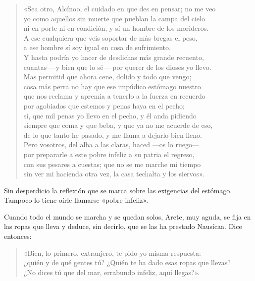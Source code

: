 \documentclass[11pt,a4paper]{article}
\begin{document}
\begin{verse}
«Sea otro, Alcínoo, el cuidado en que des en pensar; no me veo\\
yo como aquellos sin muerte que pueblan la campa del cielo\\
ni en porte ni en condición, y sí un hombre de los morideros.\\
A ese cualquiera que veis soportar de más bregas el peso,\\
a ese hombre sí soy igual en cosa de sufrimiento.\\
Y hasta podría yo hacer de desdichas más grande recuento,\\
cuantas ---y bien que lo sé--- por querer de los dioses yo llevo.\\
Mas permitid que ahora cene, dolido y todo que vengo;\\
cosa más perra no hay que ese impúdico estómago nuestro\\
que nos reclama y apremia a tenerlo a la fuerza en recuerdo\\
por agobiados que estemos y penas haya en el pecho;\\
sí, que mil penas yo llevo en el pecho, y él anda pidiendo\\
siempre que coma y que beba, y que ya no me acuerde de eso,\\
de lo que tanto he pasado, y me llama a dejarlo bien lleno.\\
Pero vosotros, del alba a las claras, haced ---os lo ruego---\\
por prepararle a este pobre infeliz a su patria el regreso,\\
con sus pesares a cuestas; que no se me marche mi tiempo\\
sin ver mi hacienda otra vez, la casa techalta y los siervos».
\end{verse}

Sin desperdicio la reflexión que se marca sobre las exigencias del estómago. Tampoco lo tiene oírle llamarse «pobre infeliz».

Cuando todo el mundo se marcha y se quedan solos, Arete, muy aguda, se fija en las ropas que lleva y deduce, sin decirlo, que se las ha prestado Nausícaa. Dice entonces:

\begin{verse}
«Bien, lo primero, extranjero, te pido yo misma respuesta:\\
¿quién y de qué gentes tú? ¿Quién te ha dado esas ropas que llevas?\\
¿No dices tú que del mar, errabundo infeliz, aquí llegas?».
\end{verse}
\end{document}
